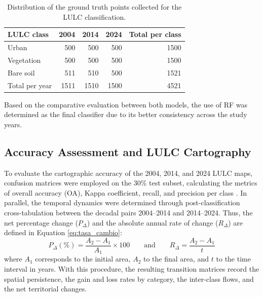 \documentclass[runningheads]{llncs}
\begin{document}
\begin{table}[t]
\centering
\caption{Distribution of the ground truth points collected for the LULC classification.}
\label{tab:puntos_muestra}
\small
\begin{tabular}{lrrrr}
\hline
LULC class & 2004 & 2014 & 2024 & Total per class \\
\hline
Urban & 500 & 500 & 500 & 1500 \\
Vegetation & 500 & 500 & 500 & 1500 \\
Bare soil & 511 & 510 & 500 & 1521 \\
Total per year & 1511 & 1510 & 1500 & 4521 \\
\hline
\end{tabular}
\end{table}

 Based on the comparative evaluation between both models, the use of RF was determined as the final classifier due to its better consistency across the study years.

\subsection{Accuracy Assessment and LULC Cartography}
\label{subsec:analisis_precision_cartografia}

To evaluate the cartographic accuracy of the 2004, 2014, and 2024 LULC maps, confusion matrices were employed on the 30\% test subset, calculating the metrics of overall accuracy (OA), Kappa coefficient, recall, and precision per class \cite{564_Patel_India}. In parallel, the temporal dynamics were determined through post-classification cross-tabulation between the decadal pairs 2004--2014 and 2014--2024. Thus, the net percentage change ($P_{\Delta}$) and the absolute annual rate of change ($R_{\Delta}$) are defined in Equation \ref{eq:tasa_cambio}:
\begin{equation} \label{eq:tasa_cambio}
P_{\Delta} (\%) = \frac{A_2 - A_1}{A_1} \times 100 \qquad \text{and} \qquad R_{\Delta} = \frac{A_2 - A_1}{t}
\end{equation}
where $A_1$ corresponds to the initial area, $A_2$ to the final area, and $t$ to the time interval in years. With this procedure, the resulting transition matrices record the spatial persistence, the gain and loss rates by category, the inter-class flows, and the net territorial changes.

\end{document}
